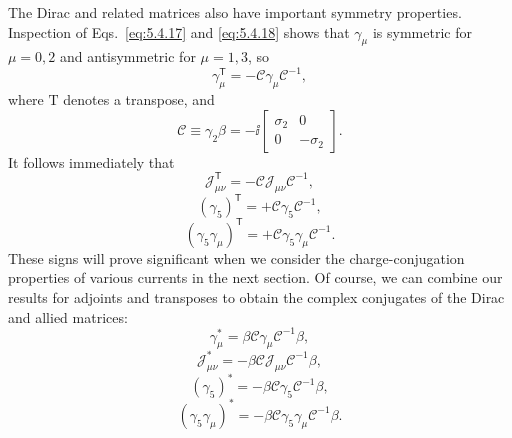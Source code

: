 The Dirac and related matrices also have important symmetry properties.
Inspection of Eqs.~\eqref{eq:5.4.17} and \eqref{eq:5.4.18} shows that $\gamma_\mu$ is symmetric
for $\mu=0,2$ and antisymmetric for $\mu=1,3$, so
\begin{equation}
\gamma_\mu^{\mathsf T}=-\mathcal{C}\gamma_\mu\mathcal{C}^{-1},
\tag{5.4.35}\label{eq:5.4.35}
\end{equation}
where $\mathrm T$ denotes a transpose, and
\begin{equation}
\mathcal{C}\equiv\gamma_2\beta=-\ii
\begin{bmatrix}\sigma_2&0\\0&-\sigma_2\end{bmatrix}.
\tag{5.4.36}\label{eq:5.4.36}
\end{equation}
It follows immediately that
\begin{equation}
\mathcal{J}_{\mu\nu}^{\mathsf T}=-\mathcal{C}\mathcal{J}_{\mu\nu}\mathcal{C}^{-1},
\tag{5.4.37}\label{eq:5.4.37}
\end{equation}
\begin{equation}
(\gamma_5)^{\mathsf T}=+\mathcal{C}\gamma_5\mathcal{C}^{-1},
\tag{5.4.38}\label{eq:5.4.38}
\end{equation}
\begin{equation}
(\gamma_5\gamma_\mu)^{\mathsf T}
=+\mathcal{C}\gamma_5\gamma_\mu\mathcal{C}^{-1}.
\tag{5.4.39}\label{eq:5.4.39}
\end{equation}
These signs will prove significant when we consider the charge-conjugation
properties of various currents in the next section. Of course, we can combine
our results for adjoints and transposes to obtain the complex conjugates of the
Dirac and allied matrices:
\begin{equation}
\gamma_\mu^*=\beta\mathcal{C}\gamma_\mu\mathcal{C}^{-1}\beta,
\tag{5.4.40}\label{eq:5.4.40}
\end{equation}
\begin{equation}
\mathcal{J}_{\mu\nu}^*=-\beta\mathcal{C}\mathcal{J}_{\mu\nu}\mathcal{C}^{-1}\beta,
\tag{5.4.41}\label{eq:5.4.41}
\end{equation}
\begin{equation}
(\gamma_5)^*=-\beta\mathcal{C}\gamma_5\mathcal{C}^{-1}\beta,
\tag{5.4.42}\label{eq:5.4.42}
\end{equation}
\begin{equation}
(\gamma_5\gamma_\mu)^*=-\beta\mathcal{C}\gamma_5\gamma_\mu\mathcal{C}^{-1}\beta.
\tag{5.4.43}\label{eq:5.4.43}
\end{equation}
